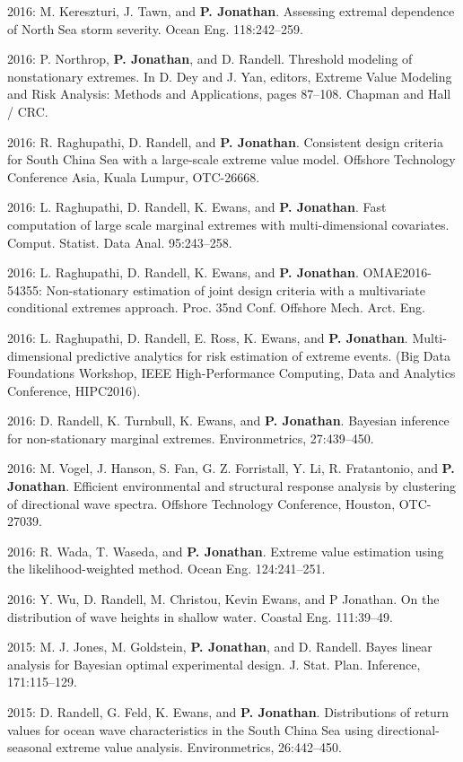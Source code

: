 \documentclass[11pt,a4paper]{moderncv}
\begin{document}
2016: M. Kereszturi, J. Tawn, and \textbf{P. Jonathan}. Assessing extremal dependence of North Sea storm severity. Ocean Eng. 118:242--259.

2016: P. Northrop, \textbf{P. Jonathan}, and D. Randell. Threshold modeling of nonstationary extremes. In D. Dey and J. Yan, editors, Extreme Value Modeling and Risk Analysis: Methods and Applications, pages 87--108. Chapman and Hall / CRC.

2016: R. Raghupathi, D. Randell, and \textbf{P. Jonathan}. Consistent design criteria for South China Sea with a large-scale extreme value model. Offshore Technology Conference Asia, Kuala Lumpur, OTC-26668.

2016: L. Raghupathi, D. Randell, K. Ewans, and \textbf{P. Jonathan}. Fast computation of large scale marginal extremes with multi-dimensional covariates. Comput. Statist. Data Anal. 95:243--258.

2016: L. Raghupathi, D. Randell, K. Ewans, and \textbf{P. Jonathan}. OMAE2016-54355: Non-stationary estimation of joint design criteria with a multivariate conditional extremes approach. Proc. 35nd Conf. Offshore Mech. Arct. Eng.

2016: L. Raghupathi, D. Randell, E. Ross, K. Ewans, and \textbf{P. Jonathan}. Multi-dimensional predictive analytics for risk estimation of extreme events. (Big Data Foundations Workshop, IEEE High-Performance Computing, Data and Analytics Conference, HIPC2016).

2016: D. Randell, K. Turnbull, K. Ewans, and \textbf{P. Jonathan}. Bayesian inference for non-stationary marginal extremes. Environmetrics, 27:439--450.

2016: M. Vogel, J. Hanson, S. Fan, G. Z. Forristall, Y. Li, R. Fratantonio, and \textbf{P. Jonathan}. Efficient environmental and structural response analysis by clustering of directional wave spectra. Offshore Technology Conference, Houston, OTC-27039.

2016: R. Wada, T. Waseda, and \textbf{P. Jonathan}. Extreme value estimation using the likelihood-weighted method. Ocean Eng. 124:241--251.

2016: Y. Wu, D. Randell, M. Christou, Kevin Ewans, and P Jonathan. On the distribution of wave heights in shallow water. Coastal Eng. 111:39--49.

2015: M. J. Jones, M. Goldstein, \textbf{P. Jonathan}, and D. Randell. Bayes linear analysis for Bayesian optimal experimental design. J. Stat. Plan. Inference, 171:115--129.

2015: D. Randell, G. Feld, K. Ewans, and \textbf{P. Jonathan}. Distributions of return values for ocean wave characteristics in the South China Sea using directional-seasonal extreme value analysis. Environmetrics, 26:442--450.
\end{document}
